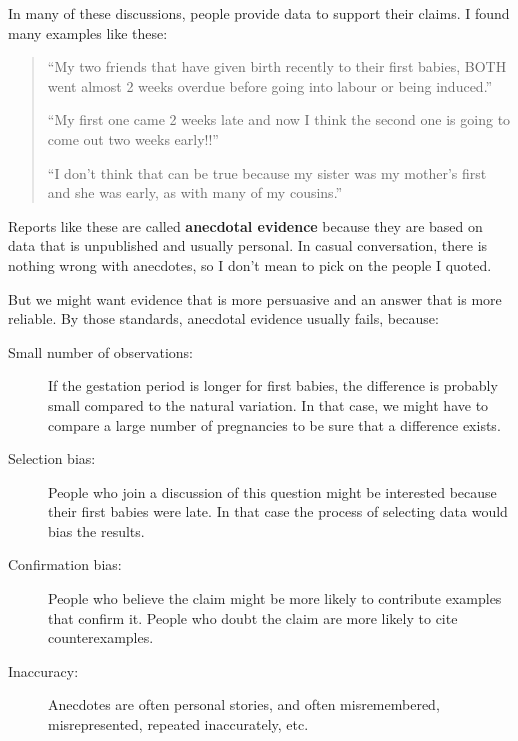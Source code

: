 \documentclass[12pt]{book}
\begin{document}
In many of these discussions, people provide data to support their
claims.  I found many examples like these:

\begin{quote}

``My two friends that have given birth recently to their first babies,
BOTH went almost 2 weeks overdue before going into labour or being
induced.''

``My first one came 2 weeks late and now I think the second one is
going to come out two weeks early!!''

``I don't think that can be true because my sister was my mother's
first and she was early, as with many of my cousins.''

\end{quote}

Reports like these are called {\bf anecdotal evidence} because they
are based on data that is unpublished and usually personal.  In casual
conversation, there is nothing wrong with anecdotes, so I don't mean
to pick on the people I quoted.

But we might want evidence that is more persuasive and
an answer that is more reliable.  By those standards, anecdotal
evidence usually fails, because:

\begin{description}

\item[Small number of observations:] If the gestation period is longer
  for first babies, the difference is probably small compared to the
  natural variation.  In that case, we might have to compare a large
  number of pregnancies to be sure that a difference exists.

\item[Selection bias:] People who join a discussion of this question
  might be interested because their first babies were late.  In that
  case the process of selecting data would bias the results.

\item[Confirmation bias:] People who believe the claim might be more
  likely to contribute examples that confirm it.  People who doubt the
  claim are more likely to cite counterexamples.

\item[Inaccuracy:] Anecdotes are often personal stories, and often
  misremembered, misrepresented, repeated
  inaccurately, etc.

\end{description}
\end{document}
